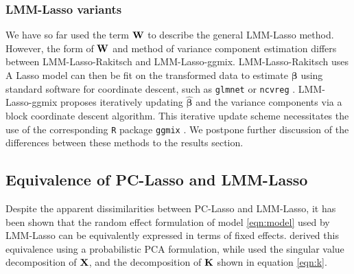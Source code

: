 \subsubsection{LMM-Lasso variants}

We have so far used the term $\textbf{W}$ to describe the general LMM-Lasso method. However, the form of $\textbf{W}$ and method of variance component estimation differs between LMM-Lasso-Rakitsch and LMM-Lasso-ggmix. LMM-Lasso-Rakitsch \cite{Rakitsch2012} uses  A Lasso model can then be fit on the transformed data to estimate $\boldsymbol{\beta}$ using standard software for coordinate descent, such as \texttt{glmnet} \cite{glmnet} or \texttt{ncvreg} \cite{ncvreg}. LMM-Lasso-ggmix \cite{bhatnagar2019simultaneous} proposes iteratively updating $\widehat{\boldsymbol{\beta}}$ and the variance components via a block coordinate descent algorithm. This iterative update scheme necessitates the use of the corresponding \texttt{R} package \texttt{ggmix} \cite{ggmix, bhatnagar2019simultaneous}. We postpone further discussion of the differences between these methods to the results section.



\subsection{Equivalence of PC-Lasso and LMM-Lasso}

 

Despite the apparent dissimilarities between PC-Lasso and LMM-Lasso, it has been shown that the random effect formulation of model \ref{eqn:model} used by LMM-Lasso can be equivalently expressed in terms of fixed effects. \cite{zhang2015principal} derived this equivalence using a probabilistic PCA formulation, while \cite{hoffman2013correcting} used the singular value decomposition of $\textbf{X}$, and the decomposition of $\textbf{K}$ shown in equation \eqref{eqn:k}.  

